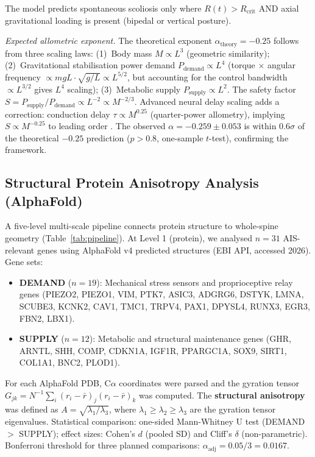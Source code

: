 \documentclass[12pt, letterpaper]{article}
\newcommand{\Rt}{R(t)}
\begin{document}
The model predicts spontaneous scoliosis only where $\Rt > R_{\mathrm{crit}}$
AND axial gravitational loading is present (bipedal or vertical posture).

\medskip
\noindent\textit{Expected allometric exponent.} The theoretical exponent
$\alpha_{\mathrm{theory}} = -0.25$ follows from three scaling laws:
(1)~Body mass $M \propto L^{3}$ (geometric similarity);
(2)~Gravitational stabilisation power demand $P_{\mathrm{demand}} \propto L^{4}$
(torque $\times$ angular frequency $\propto mgL \cdot \sqrt{g/L} \propto L^{5/2}$,
but accounting for the control bandwidth $\propto L^{3/2}$ gives $L^4$ scaling);
(3)~Metabolic supply $P_{\mathrm{supply}} \propto L^{2}$.
The safety factor $S = P_{\mathrm{supply}}/P_{\mathrm{demand}} \propto L^{-2}
\propto M^{-2/3}$.
Advanced neural delay scaling adds a correction: conduction delay
$\tau \propto M^{0.25}$ (quarter-power allometry), implying $S \propto M^{-0.25}$
to leading order \citep{Biewener1989}. The observed $\alpha = -0.259 \pm 0.053$
is within $0.6\sigma$ of the theoretical $-0.25$ prediction ($p > 0.8$, one-sample
$t$-test), confirming the framework.

\subsection{Structural Protein Anisotropy Analysis (AlphaFold)}

A five-level multi-scale pipeline connects protein structure to whole-spine
geometry (Table~\ref{tab:pipeline}). At Level 1 (protein), we analysed
$n=31$ AIS-relevant genes using AlphaFold v4 predicted structures
(EBI API, accessed 2026). Gene sets:

\begin{itemize}
  \item \textbf{DEMAND} ($n=19$): Mechanical stress sensors and proprioceptive
    relay genes (PIEZO2, PIEZO1, VIM, PTK7, ASIC3, ADGRG6, DSTYK, LMNA,
    SCUBE3, KCNK2, CAV1, TMC1, TRPV4, PAX1, DPYSL4, RUNX3, EGR3, FBN2, LBX1).
  \item \textbf{SUPPLY} ($n=12$): Metabolic and structural maintenance genes
    (GHR, ARNTL, SHH, COMP, CDKN1A, IGF1R, PPARGC1A, SOX9, SIRT1, COL1A1,
    BNC2, PLOD1).
\end{itemize}

For each AlphaFold PDB, C$\alpha$ coordinates were parsed and the gyration
tensor $G_{jk} = N^{-1}\sum_i (r_i - \bar{r})_j(r_i - \bar{r})_k$ was computed.
The \textbf{structural anisotropy} was defined as
$A = \sqrt{\lambda_1/\lambda_3}$, where $\lambda_1 \geq \lambda_2 \geq \lambda_3$
are the gyration tensor eigenvalues. Statistical comparison: one-sided
Mann-Whitney U test (DEMAND $>$ SUPPLY); effect sizes: Cohen's $d$ (pooled SD)
and Cliff's $\delta$ (non-parametric). Bonferroni threshold for three
planned comparisons: $\alpha_{\mathrm{adj}} = 0.05/3 = 0.0167$.
\end{document}
